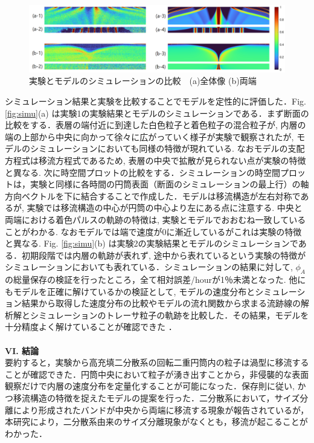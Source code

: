 \documentclass[prl,twocolumn,superscriptaddress]{revtex4}
\begin{document}
\begin{figure}[t]
 \begin{center}
  \includegraphics[width=\textwidth]{figure/24_43_heatmap2.bmp}
  \caption{実験とモデルのシミュレーションの比較　(a)全体像 (b)両端}
  \label{}
 \end{center}
\end{figure}
シミュレーション結果と実験を比較することでモデルを定性的に評価した．Fig. \ref{fig:simu}(a) は実験1の実験結果とモデルのシミュレーションである．まず断面の比較をする．表層の端付近に到達した白色粒子と着色粒子の混合粒子が, 内層の端の上部から中央に向かって徐々に広がっていく様子が実験で観察されたが, モデルのシミュレーションにおいても同様の特徴が現れている. なおモデルの支配方程式は移流方程式であるため, 表層の中央で拡散が見られない点が実験の特徴と異なる. 次に時空間プロットの比較をする．シミュレーションの時空間プロットは，実験と同様に各時間の円筒表面（断面のシミュレーションの最上行）の軸方向ベクトルを下に結合することで作成した．モデルは移流構造が左右対称であるが, 実験では移流構造の中心が円筒の中心より左にある点に注意する. 中央と両端における着色パルスの軌跡の特徴は, 実験とモデルでおおむね一致していることがわかる. なおモデルでは端で速度が0に漸近しているがこれは実験の特徴と異なる.  Fig. \ref{fig:simu}(b) は実験2の実験結果とモデルのシミュレーションである．初期段階では内層の軌跡が表れず, 途中から表れているという実験の特徴がシミュレーションにおいても表れている．シミュレーションの結果に対して, $\phi_A$の総量保存の検証を行ったところ，全て相対誤差/hourが1％未満となった. 他にもモデルを正確に解けているかの検証として, モデルの速度分布とシミュレーション結果から取得した速度分布の比較やモデルの流れ関数\cite{Batchelor00:fluid}から求まる流跡線の解析解とシミュレーションのトレーサ粒子の軌跡を比較した．その結果，モデルを十分精度よく解けていることが確認できた \cite{supplement}．\\
\\
{\bf V\hspace{-.1em}I. 結論} \\
要約すると，実験から高充填二分散系の回転二重円筒内の粒子は渦型に移流することが確認できた．円筒中央において粒子が湧き出すことから，非侵襲的な表面観察だけで内層の速度分布を定量化することが可能になった．保存則に従い, かつ移流構造の特徴を捉えたモデルの提案を行った．二分散系において，サイズ分離により形成されたバンドが中央から両端に移流する現象が報告されているが，本研究により，二分散系由来のサイズ分離現象がなくとも，移流が起こることがわかった．
\end{document}
